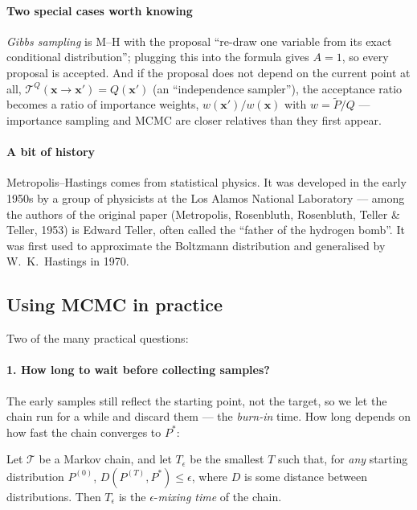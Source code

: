 \documentclass[11pt, oneside]{book}
\newcommand{\bx}{\mathbf{x}}  \newcommand{\by}{\mathbf{y}}
\let\originalsubsection\subsection
\renewcommand{\subsection}{\Needspace{6\baselineskip}\originalsubsection}
\begin{document}
\paragraph{Two special cases worth knowing} \emph{Gibbs sampling} is M--H with
the proposal ``re-draw one variable from its exact conditional
distribution''; plugging this into the formula gives $A = 1$, so every
proposal is accepted. And if the proposal does not depend on the current point
at all, $\mathcal{T}^Q(\bx \to \bx') = Q(\bx')$ (an ``independence
sampler''), the acceptance ratio becomes a ratio of importance weights,
$w(\bx')/w(\bx)$ with $w = \tilde P/Q$ --- importance sampling and MCMC are
closer relatives than they first appear.

\paragraph{A bit of history} Metropolis--Hastings comes from statistical
physics. It was developed in the early 1950s by a group of physicists at the
Los Alamos National Laboratory --- among the authors of the original paper
(Metropolis, Rosenbluth, Rosenbluth, Teller \& Teller, 1953) is Edward Teller,
often called the ``father of the hydrogen bomb''. It was first used to
approximate the Boltzmann distribution and generalised by W.~K.~Hastings in
1970.

\subsection{Using MCMC in practice}
\label{sec:mcmc-practice}

Two of the many practical questions:

\paragraph{1. How long to wait before collecting samples?} The early samples
still reflect the starting point, not the target, so we let the chain run for
a while and discard them --- the \emph{burn-in} time. How long depends on how
fast the chain converges to $P^*$:

\begin{defbox}[title={Mixing time}]
Let $\mathcal{T}$ be a Markov chain, and let $T_\epsilon$ be the smallest $T$
such that, for \emph{any} starting distribution $P^{(0)}$,
$D(P^{(T)}, P^*) \leq \epsilon$, where $D$ is some distance between
distributions. Then $T_\epsilon$ is the $\epsilon$-\emph{mixing time} of the
chain.
\end{defbox}
\end{document}
